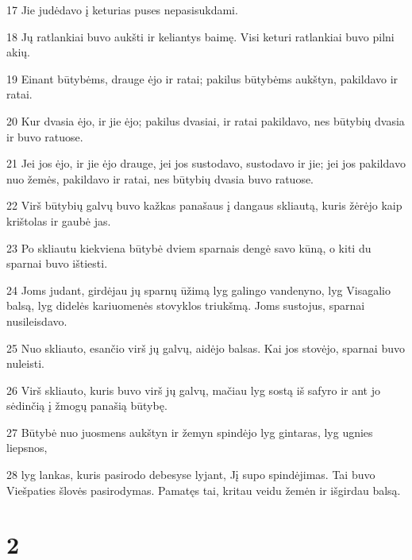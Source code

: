 \par 17 Jie judėdavo į keturias puses nepasisukdami. 
\par 18 Jų ratlankiai buvo aukšti ir keliantys baimę. Visi keturi ratlankiai buvo pilni akių. 
\par 19 Einant būtybėms, drauge ėjo ir ratai; pakilus būtybėms aukštyn, pakildavo ir ratai. 
\par 20 Kur dvasia ėjo, ir jie ėjo; pakilus dvasiai, ir ratai pakildavo, nes būtybių dvasia ir buvo ratuose. 
\par 21 Jei jos ėjo, ir jie ėjo drauge, jei jos sustodavo, sustodavo ir jie; jei jos pakildavo nuo žemės, pakildavo ir ratai, nes būtybių dvasia buvo ratuose. 
\par 22 Virš būtybių galvų buvo kažkas panašaus į dangaus skliautą, kuris žėrėjo kaip krištolas ir gaubė jas. 
\par 23 Po skliautu kiekviena būtybė dviem sparnais dengė savo kūną, o kiti du sparnai buvo ištiesti. 
\par 24 Joms judant, girdėjau jų sparnų ūžimą lyg galingo vandenyno, lyg Visagalio balsą, lyg didelės kariuomenės stovyklos triukšmą. Joms sustojus, sparnai nusileisdavo. 
\par 25 Nuo skliauto, esančio virš jų galvų, aidėjo balsas. Kai jos stovėjo, sparnai buvo nuleisti. 
\par 26 Virš skliauto, kuris buvo virš jų galvų, mačiau lyg sostą iš safyro ir ant jo sėdinčią į žmogų panašią būtybę. 
\par 27 Būtybė nuo juosmens aukštyn ir žemyn spindėjo lyg gintaras, lyg ugnies liepsnos, 
\par 28 lyg lankas, kuris pasirodo debesyse lyjant, Jį supo spindėjimas. Tai buvo Viešpaties šlovės pasirodymas. Pamatęs tai, kritau veidu žemėn ir išgirdau balsą.


\chapter{2}


